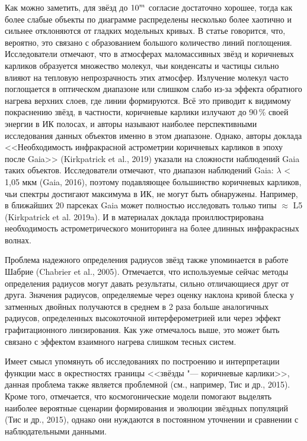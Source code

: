 Как можно заметить, для звёзд до \(\textup{10}^m\) согласие достаточно хорошее, тогда как более слабые объекты по диаграмме распределены несколько более хаотично и сильнее отклоняются от гладких модельных кривых. В статье говорится, что, вероятно, это связано с образованием большого количество линий поглощения. Исследователи отмечают, что в атмосферах маломассивных звёзд и коричневых карликов образуется множество молекул, чьи конденсаты и частицы сильно влияют на тепловую непрозрачность этих атмосфер. Излучение молекул часто поглощается в оптическом диапазоне или слишком слабо из-за эффекта обратного нагрева верхних слоев, где линии формируются. Всё это приводит к видимому покраснению звёзд, в частности, коричневые карлики излучают до 90\,\% своей энергии в ИК полосах, и авторы называют наиболее перспективными исследования данных объектов именно в этом диапазоне. Однако, авторы доклада <<Необходимость инфракрасной астрометрии коричневых карликов в эпоху после Gaia>> (Kirkpatrick et al., 2019) указали на сложности наблюдений Gaia таких объектов. Исследователи отмечают, что диапазон наблюдений Gaia: $\lambda$ < 1,05 мкм (Gaia, 2016), поэтому подавляющее большинство коричневых карликов, чьи спектры достигают максимума в ИК, не могут быть обнаружены. Например, в ближайших 20 парсеках Gaia может полностью исследовать только типы $\approx$ L5 (Kirkpatrick et al. 2019a). И в материалах доклада проиллюстрирована необходимость астрометрического мониторинга на более длинных инфракрасных волнах.

Проблема надежного определения радиусов звёзд также упоминается в работе Шабрие (Chabrier et al., 2005). Отмечается, что используемые сейчас методы определения радиусов могут давать результаты, сильно отличающиеся друг от друга. Значения радиусов, определяемые через оценку наклона кривой блеска у затменных двойных получаются в среднем в 2 раза больше аналогичных радиусов, определенных высокоточной интерферометрией или через эффект графитационного линзирования. Как уже отмечалось выше, это может быть связано с эффектом взаимного нагрева слишком тесных систем.

Имеет смысл упомянуть об исследованиях по построению и интерпретации функции масс в окрестностях границы <<звёзды "--- коричневые карлики>>, данная проблема также является проблемной  (см., например, Тис и др., 2015).  Кроме того, отмечается, что космогонические модели помогают выделять наиболее вероятные сценарии формирования и эволюции звёздных популяций (Тис и др., 2015), однако они нуждаются в постоянном уточнении и сравнении с наблюдательными данными.

